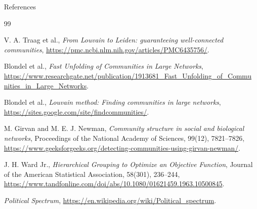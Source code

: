 \documentclass[compress]{beamer}
\begin{document}
%     
%     
\begin{frame}[allowframebreaks]{References}
\begin{thebibliography}{99}

V. A. Traag et al., 
{\em From Louvain to Leiden: guaranteeing well-connected communities}, 
\url{https://pmc.ncbi.nlm.nih.gov/articles/PMC6435756/}.

Blondel et al., 
{\em Fast Unfolding of Communities in Large Networks}, 
\url{https://www.researchgate.net/publication/1913681_Fast_Unfolding_of_Communities_in_Large_Networks}.

Blondel et al., 
{\em Louvain method: Finding communities in large networks}, 
\url{https://sites.google.com/site/findcommunities/}.

M. Girvan and M. E. J. Newman, 
{\em Community structure in social and biological networks}, 
Proceedings of the National Academy of Sciences, 99(12), 7821–7826, 
\url{https://www.geeksforgeeks.org/detecting-communities-using-girvan-newman/}.

J. H. Ward Jr., 
{\em Hierarchical Grouping to Optimize an Objective Function}, 
Journal of the American Statistical Association, 58(301), 236–244, 
\url{https://www.tandfonline.com/doi/abs/10.1080/01621459.1963.10500845}.

{\em Political Spectrum}, 
\url{https://en.wikipedia.org/wiki/Political_spectrum}.

\end{thebibliography}
\end{frame}
\end{document}
